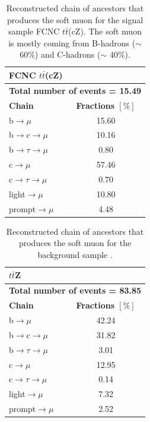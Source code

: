 \begin{table}[!h]
	\centering          
	\begin{tabular}{|l|c|}          
		\hline          
		\multicolumn{2}{|l|}{\textbf{FCNC $t\bar{t}$(cZ)}}    \\        
		\hline          
		\multicolumn{2}{|l|}{\textbf{Total number of events = 15.49}}    \\
		\hline
		\textbf{Chain}        									 & \textbf{Fractions $[\%]$} \\                          
		\hline          
		b$\rightarrow \mu$                 					&   15.60  \\          
		b$\rightarrow$c$\rightarrow \mu$     	&    10.16   \\          
		b$\rightarrow \tau \rightarrow \mu$  	&    0.80 \\          
		c$\rightarrow \mu$                 				 &    57.46\\          
		c$\rightarrow \tau \rightarrow \mu$  	&     0.70 \\          
		light$\rightarrow \mu$              			&    10.80  \\          
		prompt$\rightarrow \mu$                	 	&   4.48 \\            
		\hline    
	\end{tabular}    
	\caption{Reconstructed chain of ancestors that produces the soft muon for the signal sample FCNC $t\bar{t}$(cZ). The soft muon is mostly coming from B-hadrons ($\sim$ 60\%)  and C-hadrons ($\sim$ 40\%). }
	\label{tab:sig_comp}
\end{table}    
\begin{table}[!h]
	\centering          
	\begin{tabular}{|l|c|}          
		\hline          
		\multicolumn{2}{|l|}{\textbf{$t\bar t$Z}}    \\        
		\hline          
		\multicolumn{2}{|l|}{\textbf{Total number of events = 83.85}}    \\
		\hline
		\textbf{Chain}        									 & \textbf{Fractions $[\%]$} \\                          
		\hline          
		b$\rightarrow \mu$                 					&   42.24  \\          
		b$\rightarrow$c$\rightarrow \mu$     	&    31.82    \\          
		b$\rightarrow \tau \rightarrow \mu$  	&    3.01 \\          
		c$\rightarrow \mu$                 				 &    12.95\\          
		c$\rightarrow \tau \rightarrow \mu$  	&     0.14\\          
		light$\rightarrow \mu$              			&    7.32 \\          
		prompt$\rightarrow \mu$                	 	&   2.52\\            
		\hline    
	\end{tabular}    
	\caption{Reconstructed chain of ancestors that produces the soft muon for the background sample \ttZ.}
	\label{tab:ttZ_comp}
\end{table}    

